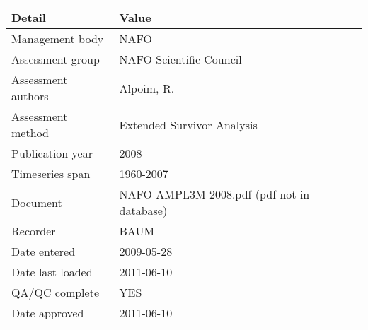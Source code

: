 \begin{table}[htb]
\centering
\begin{tabular}{ll}
\toprule
Detail & Value \\
\midrule
Management body    & NAFO                                       \\
Assessment group   & NAFO Scientific Council                    \\
Assessment authors & Alpoim, R.                                 \\
Assessment method  & Extended Survivor Analysis                 \\
Publication year   & 2008                                       \\
Timeseries span    & 1960-2007                                  \\
Document           & NAFO-AMPL3M-2008.pdf (pdf not in database) \\
Recorder           & BAUM                                       \\
Date entered       & 2009-05-28                                 \\
Date last loaded   & 2011-06-10                                 \\
QA/QC complete     & YES                                        \\
Date approved      & 2011-06-10                                 \\
\bottomrule
\end{tabular}
\label{tab:assessdet}
\end{table}
